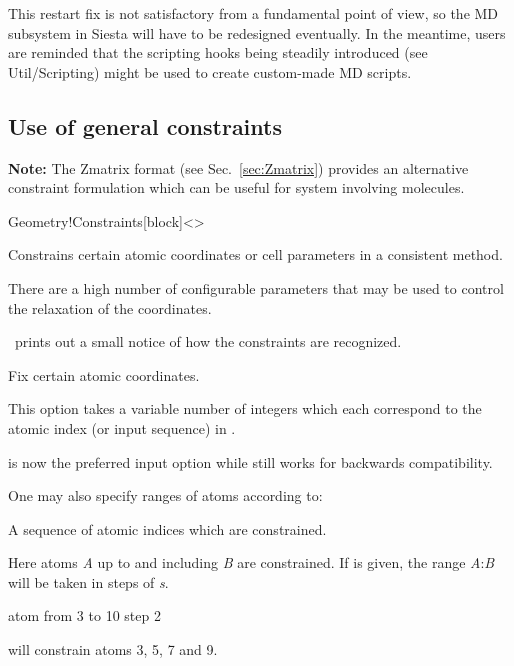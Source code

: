 This restart fix is not satisfactory from a fundamental point of view,
so the MD subsystem in Siesta will have to be redesigned
eventually. In the meantime, users are reminded that the scripting
hooks being steadily introduced (see Util/Scripting) might be used to
create custom-made MD scripts.


\subsection{Use of general constraints}

\textbf{Note:} The Zmatrix format (see Sec.~\ref{sec:Zmatrix}) provides
an alternative constraint formulation which can be useful for system
involving molecules.

\begin{fdfentry}{Geometry!Constraints}[block]<>


  Constrains certain atomic coordinates or cell parameters in a
  consistent method.

  There are a high number of configurable parameters that may be used
  to control the relaxation of the coordinates.

  \note \siesta\ prints out a small notice of how the constraints are
  recognized. 

  \begin{fdfoptions}
    Fix certain atomic coordinates. 

    This option takes a variable number of integers which each
    correspond to the atomic index (or input sequence) in
    .

     is now the preferred input option while
     still works for backwards compatibility.

    One may also specify ranges of atoms according to:

    \begin{fdfoptions}
      A sequence of atomic indices which are constrained. 

      Here atoms \emph{A} up to and including \emph{B} are
      constrained.
      If  is given, the range
      \emph{A}:\emph{B} will be taken in steps of \emph{s}.

      \begin{fdfexample}
        atom from 3 to 10 step 2
      \end{fdfexample}
      will constrain atoms 3, 5, 7 and 9.


\end{fdfoptions}
\end{fdfoptions}
\end{fdfentry}
